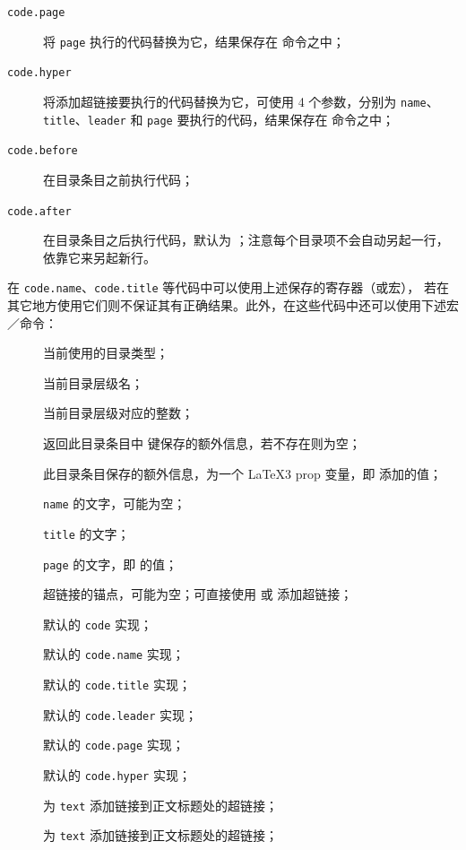 \documentclass{cusdoc}
\def\zhslash{／}
\begin{document}
\begin{description}
  \item[\texttt{code.page}] 将 \texttt{page} 执行的代码替换为它，结果保存在  命令之中；
  \item[\texttt{code.hyper}] 将添加超链接要执行的代码替换为它，可使用 4 个参数，分别为 \texttt{name}、\texttt{title}、\texttt{leader} 和 \texttt{page} 要执行的代码，结果保存在  命令之中；
  \item[\texttt{code.before}] 在目录条目之前执行代码；
  \item[\texttt{code.after}] 在目录条目之后执行代码，默认为 ；注意每个目录项不会自动另起一行，依靠它来另起新行。
\end{description}
在 \texttt{code.name}、\texttt{code.title} 等代码中可以使用上述保存的寄存器（或宏），
若在其它地方使用它们则不保证其有正确结果。此外，在这些代码中还可以使用下述宏\zhslash 命令：
\begin{description}
  \item[] 当前使用的目录类型；
  \item[] 当前目录层级名；
  \item[] 当前目录层级对应的整数；
  \item[] 返回此目录条目中  键保存的额外信息，若不存在则为空；
  \item[] 此目录条目保存的额外信息，为一个 \LaTeX3 prop 变量，即  添加的值；
  \item[] \texttt{name} 的文字，可能为空；
  \item[] \texttt{title} 的文字；
  \item[] \texttt{page} 的文字，即  的值；
  \item[] 超链接的锚点，可能为空；可直接使用  或 添加超链接；
  \item[] 默认的 \texttt{code} 实现；
  \item[] 默认的 \texttt{code.name} 实现；
  \item[] 默认的 \texttt{code.title} 实现；
  \item[] 默认的 \texttt{code.leader} 实现；
  \item[] 默认的 \texttt{code.page} 实现；
  \item[] 默认的 \texttt{code.hyper} 实现；
  \item[] 为 \texttt{text} 添加链接到正文标题处的超链接；
  \item[] 为 \texttt{text} 添加链接到正文标题处的超链接；
\end{description}
\end{document}
